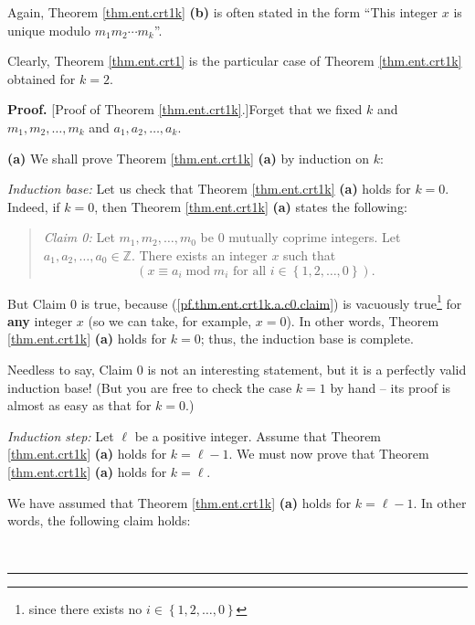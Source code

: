 \documentclass[numbers=enddot,12pt,final,onecolumn,notitlepage]{scrartcl}%
\numberwithin{exer}{subsection}
\theoremstyle{definition}
\newenvironment{statement}{\begin{quote}}{\end{quote}}
\newenvironment{proof}[1][Proof]{\noindent\textbf{#1.} }{\ \rule{0.5em}{0.5em}}
\begin{document}
Again, Theorem \ref{thm.ent.crt1k} \textbf{(b)} is often stated in the form
\textquotedblleft This integer $x$ is unique modulo $m_{1}m_{2}\cdots m_{k}%
$\textquotedblright.

Clearly, Theorem \ref{thm.ent.crt1} is the particular case of Theorem
\ref{thm.ent.crt1k} obtained for $k=2$.

\begin{proof}
[Proof of Theorem \ref{thm.ent.crt1k}.]Forget that we fixed $k$ and
$m_{1},m_{2},\ldots,m_{k}$ and $a_{1},a_{2},\ldots,a_{k}$.

\textbf{(a)} We shall prove Theorem \ref{thm.ent.crt1k} \textbf{(a)} by
induction on $k$:

\textit{Induction base:} Let us check that Theorem \ref{thm.ent.crt1k}
\textbf{(a)} holds for $k=0$. Indeed, if $k=0$, then Theorem
\ref{thm.ent.crt1k} \textbf{(a)} states the following:

\begin{statement}
\textit{Claim 0:} Let $m_{1},m_{2},\ldots,m_{0}$ be $0$ mutually coprime
integers. Let $a_{1},a_{2},\ldots,a_{0}\in\mathbb{Z}$. There exists an integer
$x$ such that
\begin{equation}
\left(  x\equiv a_{i}\operatorname{mod}m_{i}\text{ for all }i\in\left\{
1,2,\ldots,0\right\}  \right)  . \label{pf.thm.ent.crt1k.a.c0.claim}%
\end{equation}

\end{statement}

But Claim 0 is true, because (\ref{pf.thm.ent.crt1k.a.c0.claim}) is vacuously
true\footnote{since there exists no $i\in\left\{  1,2,\ldots,0\right\}  $} for
\textbf{any} integer $x$ (so we can take, for example, $x=0$). In other words,
Theorem \ref{thm.ent.crt1k} \textbf{(a)} holds for $k=0$; thus, the induction
base is complete.

Needless to say, Claim 0 is not an interesting statement, but it is a
perfectly valid induction base! (But you are free to check the case $k=1$ by
hand -- its proof is almost as easy as that for $k=0$.)

\textit{Induction step:} Let $\ell$ be a positive integer. Assume that Theorem
\ref{thm.ent.crt1k} \textbf{(a)} holds for $k=\ell-1$. We must now prove that
Theorem \ref{thm.ent.crt1k} \textbf{(a)} holds for $k=\ell$.

We have assumed that Theorem \ref{thm.ent.crt1k} \textbf{(a)} holds for
$k=\ell-1$. In other words, the following claim holds:


\end{proof}
\end{document}

